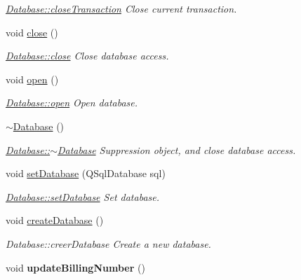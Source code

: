 \begin{DoxyCompactItemize}
\begin{DoxyCompactList}\small\item\em \hyperlink{classDatabase_a8322990bcba006d0d82ac069ad6e0307}{Database\+::close\+Transaction} Close current transaction. \end{DoxyCompactList}\item 
\hypertarget{classDatabase_ab89cb07242f0ab1d4058974bf3e7cf19}{void \hyperlink{classDatabase_ab89cb07242f0ab1d4058974bf3e7cf19}{close} ()}\label{classDatabase_ab89cb07242f0ab1d4058974bf3e7cf19}

\begin{DoxyCompactList}\small\item\em \hyperlink{classDatabase_ab89cb07242f0ab1d4058974bf3e7cf19}{Database\+::close} Close database access. \end{DoxyCompactList}\item 
\hypertarget{classDatabase_a0d0134e05c8f2dc4fcbbb2f36c02a779}{void \hyperlink{classDatabase_a0d0134e05c8f2dc4fcbbb2f36c02a779}{open} ()}\label{classDatabase_a0d0134e05c8f2dc4fcbbb2f36c02a779}

\begin{DoxyCompactList}\small\item\em \hyperlink{classDatabase_a0d0134e05c8f2dc4fcbbb2f36c02a779}{Database\+::open} Open database. \end{DoxyCompactList}\item 
\hypertarget{classDatabase_a84d399a2ad58d69daab9b05330e1316d}{\hyperlink{classDatabase_a84d399a2ad58d69daab9b05330e1316d}{$\sim$\+Database} ()}\label{classDatabase_a84d399a2ad58d69daab9b05330e1316d}

\begin{DoxyCompactList}\small\item\em \hyperlink{classDatabase_a84d399a2ad58d69daab9b05330e1316d}{Database\+::$\sim$\+Database} Suppression object, and close database access. \end{DoxyCompactList}\item 
void \hyperlink{classDatabase_a8b03d7f4a92325b9e519fd3f8a2e245c}{set\+Database} (Q\+Sql\+Database sql)
\begin{DoxyCompactList}\small\item\em \hyperlink{classDatabase_a8b03d7f4a92325b9e519fd3f8a2e245c}{Database\+::set\+Database} Set database. \end{DoxyCompactList}\item 
\hypertarget{classDatabase_a2dc260583a49889bed8097e21953594e}{void \hyperlink{classDatabase_a2dc260583a49889bed8097e21953594e}{create\+Database} ()}\label{classDatabase_a2dc260583a49889bed8097e21953594e}

\begin{DoxyCompactList}\small\item\em Database\+::creer\+Database Create a new database. \end{DoxyCompactList}\item 
\hypertarget{classDatabase_a85d328f7d0d3ee353569ad63ef992525}{void {\bfseries update\+Billing\+Number} ()}\label{classDatabase_a85d328f7d0d3ee353569ad63ef992525}

\end{DoxyCompactItemize}
